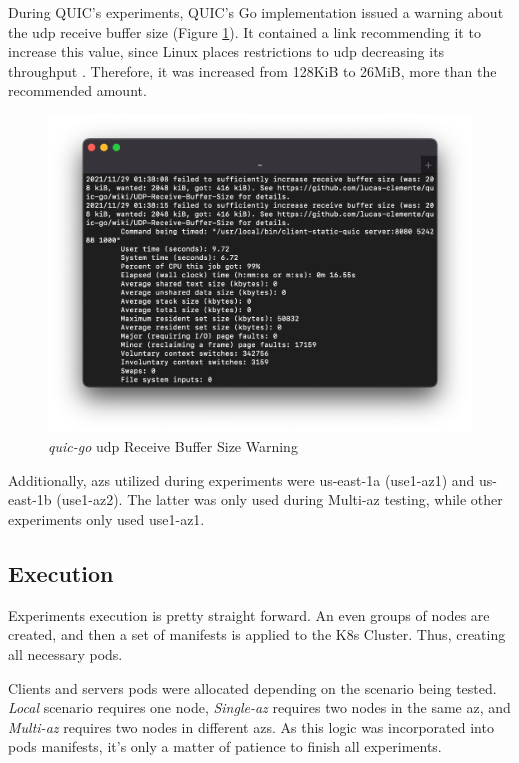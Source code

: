 During QUIC's experiments, QUIC's Go implementation issued a warning about the \gls{udp} receive buffer size (Figure \ref{fig:udp_buffer_size_warning}). It contained a link recommending it to increase this value, since Linux places restrictions to \gls{udp} decreasing its throughput \cite{udp_buffer_size_warning}. Therefore, it was increased from 128KiB to 26MiB, more than the recommended amount.

\begin{figure}[h!]
    \centering
    \includegraphics[width=\linewidth]{figures/quic_warning.png}
    \caption{\textit{quic-go} \gls{udp} Receive Buffer Size Warning}
    \label{fig:udp_buffer_size_warning}
\end{figure}

Additionally, \gls{az}s utilized during experiments were us-east-1a (use1-az1) and us-east-1b (use1-az2). The latter was only used during Multi-\gls{az} testing, while other experiments only used use1-az1.

\subsection{Execution}

Experiments execution is pretty straight forward. An even groups of nodes are created, and then a set of manifests is applied to the K8s Cluster. Thus, creating all necessary pods.

Clients and servers pods were allocated depending on the scenario being tested. \textit{Local} scenario requires one node, \textit{Single-\gls{az}} requires two nodes in the same \gls{az}, and \textit{Multi-\gls{az}} requires two nodes in different \gls{az}s. As this logic was incorporated into pods manifests, it's only a matter of patience to finish all experiments.

